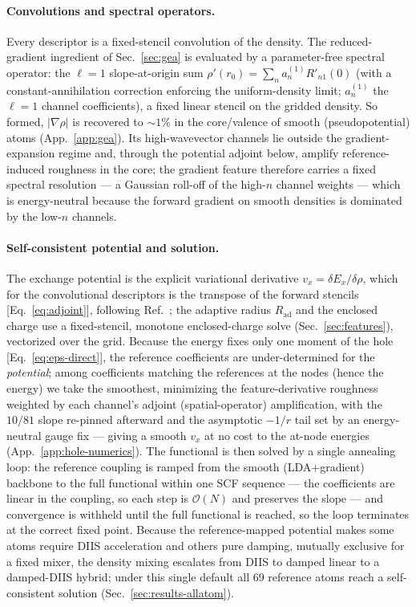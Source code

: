 \documentclass[aps,prb,reprint,superscriptaddress,nofootinbib]{revtex4-2}
\newcommand{\Rad}{R_{\mathrm{ad}}}
\begin{document}
\paragraph*{Convolutions and spectral operators.}
Every descriptor is a fixed-stencil convolution of the density. The reduced-gradient
ingredient of Sec.~\ref{sec:gea} is evaluated by a parameter-free spectral operator:
the $\ell=1$ slope-at-origin sum $\rho'(r_0)=\sum_n a^{(1)}_n R'_{n1}(0)$ (with a
constant-annihilation correction enforcing the uniform-density limit; $a^{(1)}_n$ the
$\ell=1$ channel coefficients), a fixed linear stencil on the gridded density. So
formed, $|\nabla\rho|$ is recovered to $\sim1\%$ in the core/valence of smooth
(pseudopotential) atoms (App.~\ref{app:gea}). Its high-wavevector channels lie outside the
gradient-expansion regime and, through the potential adjoint below, amplify reference-induced
roughness in the core; the gradient feature therefore carries a fixed spectral resolution --- a
Gaussian roll-off of the high-$n$ channel weights --- which is energy-neutral because the forward
gradient on smooth densities is dominated by the low-$n$ channels.

\paragraph*{Self-consistent potential and solution.}
The exchange potential is the explicit variational derivative $v_x=\delta E_x/\delta\rho$, which for the
convolutional descriptors is the transpose of the forward stencils [Eq.~\eqref{eq:adjoint}], following
Ref.~\cite{Sahoo2024}; the adaptive radius $\Rad$ and the enclosed charge use a fixed-stencil,
monotone enclosed-charge solve (Sec.~\ref{sec:features}), vectorized over the grid. Because the energy
fixes only one moment of the hole [Eq.~\eqref{eq:eps-direct}], the reference coefficients are
under-determined for the \emph{potential}; among coefficients matching the references at the nodes (hence
the energy) we take the smoothest, minimizing the feature-derivative roughness weighted by each
channel's adjoint (spatial-operator) amplification, with the $10/81$ slope re-pinned afterward and the
asymptotic $-1/r$ tail set by an energy-neutral gauge fix --- giving a smooth $v_x$ at no cost to the
at-node energies (App.~\ref{app:hole-numerics}). The functional is then solved by a single annealing
loop: the reference coupling is ramped from the smooth (LDA+gradient) backbone to the full functional
within one SCF sequence --- the coefficients are linear in the coupling, so each step is
$\mathcal{O}(N)$ and preserves the slope --- and convergence is withheld until the full functional is
reached, so the loop terminates at the correct fixed point. Because the reference-mapped potential makes
some atoms require DIIS acceleration and others pure damping, mutually exclusive for a fixed mixer, the
density mixing escalates from DIIS to damped linear to a damped-DIIS hybrid; under this single default
all 69 reference atoms reach a self-consistent solution (Sec.~\ref{sec:results-allatom}).
\end{document}
